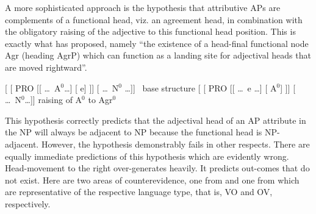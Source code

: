 \documentclass[output=paper
  ,nobabel
  ,uniformtopskip %
]{langscibook}
\begin{document}
A more sophisticated approach is the hypothesis that attributive APs are complements of a functional
head, viz. an agreement head, in combination with the obligatory raising of the adjective to this
functional head position. This is exactly what \citet[291]{Corver1997} has proposed, namely ``the
existence of a head-final functional node Agr (heading AgrP) which can function as a landing site
for adjectival heads that are moved rightward''. 

\eal
\ex\label{ex-base}{\footnotesize [ [ PRO [[ \ldots\ A$^0$\ldots]
  [ e] ]] [ \ldots\ N$^0$ \ldots]]}~ %
	base structure
\ex\label{ex-raising}{\footnotesize [ [ PRO [[ \ldots\
  e \ldots] [ A$^0$] ]] [ \ldots\ N$^0$\ldots]]}  %
	raising of A$^0$ to Agr$^0$
\zl
\vspace{-1em}

\noindent
This hypothesis correctly predicts that the adjectival head of an AP attribute in the NP will always be adjacent to NP because the functional head is NP-adjacent. However, the hypothesis demonstrably fails in other respects. There are equally immediate predictions of this hypothesis which are evidently wrong. Head-movement to the right over-generates heavily. It predicts out-comes that do not exist. Here are two areas of counterevidence, one from  and one from  which are representative of the respective language type, that is, VO and OV, respectively.
\end{document}

